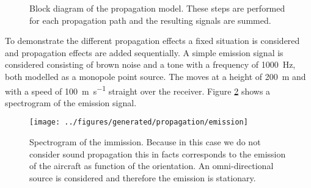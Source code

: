 \begin{figure}[H]
  \centering
{}
  \caption{Block diagram of the propagation model. These steps are performed for each propagation path and the resulting signals are summed.}
  \label{fig:propagation_block_diagram}
\end{figure}


To demonstrate the different propagation effects a fixed situation is considered
and propagation effects are added sequentially. A simple
emission signal is considered consisting of brown noise and a tone with a
frequency of \SI{1000}{\hertz}, both modelled as a monopole point source. The
 moves at a height of \SI{200}{\meter} and with a speed of
\SI{100}{\meter\per\second} straight over the receiver.
Figure \ref{fig:implementation:propagation:emission} shows a spectrogram of the
emission signal.

\begin{figure}[H]
  \centering
  \texttt{[image: ../figures/generated/propagation/emission]}
  \caption{Spectrogram of the immission. Because in this case we do not consider sound propagation this in facts corresponds to the emission of the aircraft as function of the orientation. An omni-directional source is considered and therefore the emission is stationary.}
  \label{fig:implementation:propagation:emission}
\end{figure}



